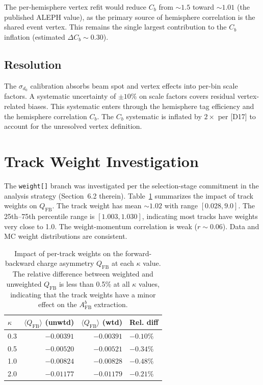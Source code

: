 \documentclass[11pt,a4paper]{article}
\begin{document}
The per-hemisphere vertex refit would reduce $C_b$ from $\sim 1.5$ toward $\sim 1.01$
(the published ALEPH value), as the primary source of hemisphere correlation is the
shared event vertex. This remains the single largest contribution to the $C_b$
inflation (estimated $\Delta C_b \sim 0.30$).

\subsection{Resolution}

The $\sigma_{d_0}$ calibration absorbs beam spot and vertex effects into per-bin scale
factors. A systematic uncertainty of $\pm 10\%$ on scale factors covers residual
vertex-related biases. This systematic enters through the hemisphere tag efficiency
and the hemisphere correlation $C_b$. The $C_b$ systematic is inflated by $2\times$
per [D17] to account for the unresolved vertex definition.

\section{Track Weight Investigation}
\label{app:track_weights}

The \texttt{weight[]} branch was investigated per the selection-stage commitment in
the analysis strategy (Section~6.2 therein). Table~\ref{tab:weight_impact} summarizes the impact
of track weights on $Q_\mathrm{FB}$.
The track weight has mean $\sim 1.02$ with range
$[0.028, 9.0]$. The 25th--75th percentile range is $[1.003, 1.030]$, indicating
most tracks have weights very close to 1.0. The weight-momentum correlation is
weak ($r \sim 0.06$). Data and MC weight distributions are consistent.

\begin{table}[htbp]
\centering
\caption{Impact of per-track weights on the forward-backward charge asymmetry
$Q_\mathrm{FB}$ at each $\kappa$ value. The relative difference between weighted
and unweighted $Q_\mathrm{FB}$ is less than 0.5\% at all $\kappa$ values, indicating
that the track weights have a minor effect on the $A_\mathrm{FB}^b$ extraction.}
\label{tab:weight_impact}
\begin{tabular}{lrrl}
\toprule
$\kappa$ & $\langle Q_\mathrm{FB} \rangle$ (unwtd) & $\langle Q_\mathrm{FB} \rangle$ (wtd) & Rel. diff \\
\midrule
0.3 & $-0.00391$ & $-0.00391$ & $-0.10\%$ \\
0.5 & $-0.00520$ & $-0.00521$ & $-0.34\%$ \\
1.0 & $-0.00824$ & $-0.00828$ & $-0.48\%$ \\
2.0 & $-0.01177$ & $-0.01179$ & $-0.21\%$ \\
\bottomrule
\end{tabular}
\end{table}
\end{document}
